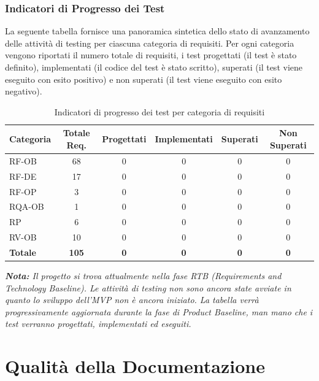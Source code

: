 \documentclass[a4paper,11pt,oneside]{scrartcl}
\begin{document}
\newpage
\subsubsection{Indicatori di Progresso dei Test}

La seguente tabella fornisce una panoramica sintetica dello stato di avanzamento delle attività di testing per ciascuna categoria di requisiti. Per ogni categoria vengono riportati il numero totale di requisiti, i test progettati (il test è stato definito), implementati (il codice del test è stato scritto), superati (il test viene eseguito con esito positivo) e non superati (il test viene eseguito con esito negativo).

\begin{table}[H]
\centering
\renewcommand{\arraystretch}{1.3}
\begin{tabularx}{\textwidth}{@{}lCCCCC@{}}
\toprule
\textbf{Categoria} & \textbf{Totale Req.} & \textbf{Progettati} & \textbf{Implementati} & \textbf{Superati} & \textbf{Non Superati} \\
\midrule
RF-OB  & 68 & 0 & 0 & 0 & 0 \\
RF-DE  & 17 & 0 & 0 & 0 & 0 \\
RF-OP  &  3 & 0 & 0 & 0 & 0 \\
RQA-OB &  1 & 0 & 0 & 0 & 0 \\
RP     &  6 & 0 & 0 & 0 & 0 \\
RV-OB  & 10 & 0 & 0 & 0 & 0 \\
\midrule
\textbf{Totale} & \textbf{105} & \textbf{0} & \textbf{0} & \textbf{0} & \textbf{0} \\
\bottomrule
\end{tabularx}
\caption{Indicatori di progresso dei test per categoria di requisiti}
\end{table}

\vspace{0.3cm}
\noindent\textit{\textbf{Nota:} Il progetto si trova attualmente nella fase RTB (Requirements and Technology Baseline). Le attività di testing non sono ancora state avviate in quanto lo sviluppo dell'MVP non è ancora iniziato. La tabella verrà progressivamente aggiornata durante la fase di Product Baseline, man mano che i test verranno progettati, implementati ed eseguiti.}

\newpage
\section{Qualità della Documentazione}
\end{document}
